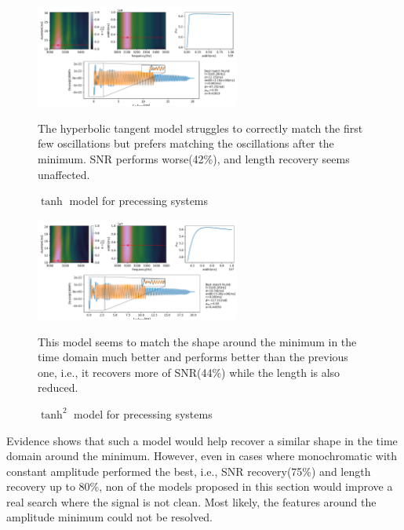 \begin{figure}[hbt!]
\begin{center}
\includegraphics[width=0.6\textwidth, angle=0]{images/Data_analysis/results/envel_110_tanh.pdf}
\caption{$\tanh$ model for precessing systems}
\end{center}
The hyperbolic tangent model struggles to correctly match the first few oscillations but prefers matching the oscillations after the minimum. SNR performs worse(42\%), and length recovery seems unaffected.
\end{figure}

\begin{figure}[hbt!]
\begin{center}
\includegraphics[width=0.6\textwidth, angle=0]{images/Data_analysis/results/envel_110_tanh2.pdf}
\caption{$\tanh^2$ model for precessing systems}
\end{center}
This model seems to match the shape around the minimum in the time domain much better and performs better than the previous one, i.e., it recovers more of SNR(44\%) while the length is also reduced.
\end{figure}

\FloatBarrier

\newpage

Evidence shows that such a model would help recover a similar shape in the time domain around the minimum. However, even in cases where monochromatic with constant amplitude performed the best, i.e., SNR recovery(75\%) and length recovery up to 80\%, non of the models proposed in this section would improve a real search where the signal is not clean. Most likely, the features around the amplitude minimum could not be resolved.

